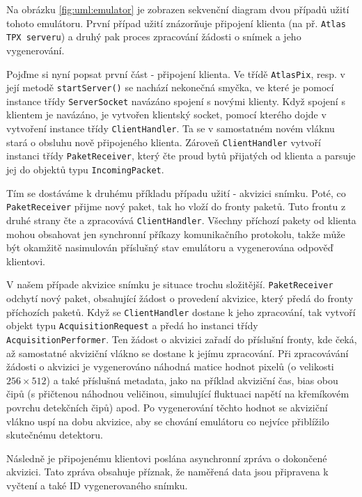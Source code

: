 Na obrázku \ref{fig:uml:emulator} je zobrazen sekvenční diagram dvou případů užití tohoto emulátoru. První případ užití znázorňuje připojení klienta (na př. \texttt{Atlas TPX serveru}) a druhý pak proces zpracování žádosti o snímek a jeho vygenerování.

Pojďme si nyní popsat první část - připojení klienta. Ve třídě \texttt{AtlasPix}, resp. v její metodě \texttt{startServer()} se nachází nekonečná smyčka, ve které je pomocí instance třídy \texttt{ServerSocket} navázáno spojení s novými klienty. Když spojení s klientem je navázáno, je vytvořen klientský socket, pomocí kterého dojde v vytvoření instance třídy \texttt{ClientHandler}. Ta se v samostatném novém vláknu stará o obsluhu nově připojeného klienta. Zároveň \texttt{ClientHandler} vytvoří instanci třídy \texttt{PaketReceiver}, který čte proud bytů přijatých od klienta a parsuje jej do objektů typu \texttt{IncomingPacket}.

Tím se dostáváme k druhému příkladu případu užití - akvizici snímku. Poté, co \texttt{PaketReceiver} přijme nový paket, tak ho vloží do fronty paketů. Tuto frontu z druhé strany čte a zpracovává \texttt{ClientHandler}. Všechny příchozí pakety od klienta mohou obsahovat jen synchronní příkazy komunikačního protokolu, takže může být okamžitě nasimulován příslušný stav emulátoru a vygenerována odpověď klientovi. 

V našem případe akvizice snímku je situace trochu složitější. \texttt{PaketReceiver} odchytí nový paket, obsahující žádost o provedení akvizice, který předá do fronty příchozích paketů. Když se \texttt{ClientHandler} dostane k jeho zpracování, tak vytvoří objekt typu \texttt{AcquisitionRequest} a předá ho instanci třídy \texttt{AcquisitionPerformer}. Ten žádost o akvizici zařadí do příslušní fronty, kde čeká, až samostatné akviziční vlákno se dostane k jejímu zpracování. Při zpracovávání žádosti o akvizici je vygenerováno náhodná matice hodnot pixelů (o velikosti $256\times512$) a také příslušná metadata, jako na příklad akviziční čas, bias obou čipů (s přičtenou náhodnou veličinou, simulující fluktuaci napětí na křemíkovém povrchu detekčních čipů) apod. Po vygenerování těchto hodnot se akviziční vlákno uspí na dobu akvizice, aby se chování emulátoru co nejvíce přiblížilo skutečnému detektoru.

Následně je připojenému klientovi poslána asynchronní zpráva o dokončené akvizici. Tato zpráva obsahuje příznak, že naměřená data jsou připravena k vyčtení a také ID vygenerovaného snímku. 

